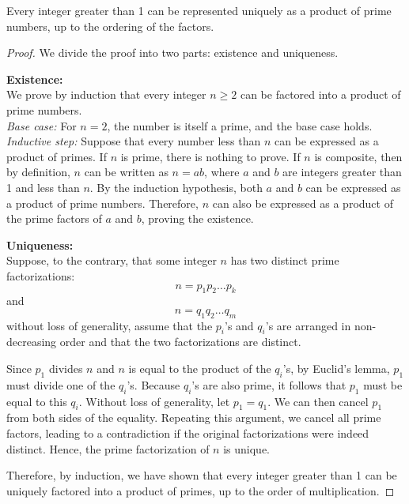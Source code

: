         \begin{theorem}
        Every integer greater than 1 can be represented uniquely as a product of prime numbers, up to the ordering of the factors.
        \end{theorem}
        \begin{proof}
        We divide the proof into two parts: existence and uniqueness.
        
        \textbf{Existence:} \\
        We prove by induction that every integer \( n \geq 2 \) can be factored into a product of prime numbers. \\
        \textit{Base case:} For \( n = 2 \), the number is itself a prime, and the base case holds. \\
        \textit{Inductive step:} Suppose that every number less than \( n \) can be expressed as a product of primes. If \( n \) is prime, there is nothing to prove. If \( n \) is composite, then by definition, \( n \) can be written as \( n = ab \), where \( a \) and \( b \) are integers greater than 1 and less than \( n \). By the induction hypothesis, both \( a \) and \( b \) can be expressed as a product of prime numbers. Therefore, \( n \) can also be expressed as a product of the prime factors of \( a \) and \( b \), proving the existence.
        
        \textbf{Uniqueness:} \\
        Suppose, to the contrary, that some integer \( n \) has two distinct prime factorizations:
        \[ n = p_1 p_2 \ldots p_k \]
        and
        \[ n = q_1 q_2 \ldots q_m \]
        without loss of generality, assume that the \( p_i \)'s and \( q_i \)'s are arranged in non-decreasing order and that the two factorizations are distinct. 
        
        Since \( p_1 \) divides \( n \) and \( n \) is equal to the product of the \( q_i \)'s, by Euclid's lemma, \( p_1 \) must divide one of the \( q_i \)'s. Because \( q_i \)'s are also prime, it follows that \( p_1 \) must be equal to this \( q_i \). Without loss of generality, let \( p_1 = q_1 \). We can then cancel \( p_1 \) from both sides of the equality. Repeating this argument, we cancel all prime factors, leading to a contradiction if the original factorizations were indeed distinct. Hence, the prime factorization of \( n \) is unique.
        
        Therefore, by induction, we have shown that every integer greater than 1 can be uniquely factored into a product of primes, up to the order of multiplication.
        \end{proof}

